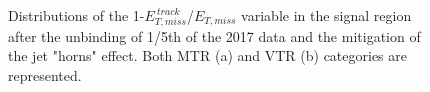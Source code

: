 \begin{figure}[htbp]
  \centering
  \caption{Distributions of the 1-$E_{T,miss}^{~track}$/$E_{T, miss}$ variable in the signal region after the unbinding of 1/5th of the 2017 data and the mitigation of the jet "horns" effect. Both MTR (a) and VTR (b) categories are represented.}
  \label{fig:2017_postHornCut_met_vs_tkmet}
\end{figure}

